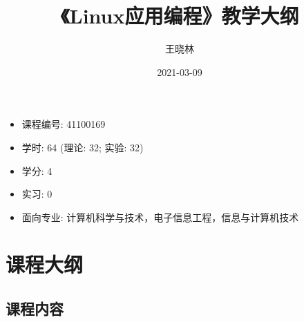 \documentclass{wx672ctexart}
\author{王晓林}
\date{2021-03-09}
\title{《Linux应用编程》教学大纲}
\begin{document}
\maketitle
\tableofcontents
\clearpage

\begin{itemize}
\item 课程编号: 41100169
\item 学时: 64 (理论: 32; 实验: 32)
\item 学分: 4
\item 实习: 0
\item 面向专业: 计算机科学与技术，电子信息工程，信息与计算机技术
\end{itemize}

\section{课程大纲}
\label{sec-1}

\subsection{课程内容}
\label{sec-1-1}
\end{document}
